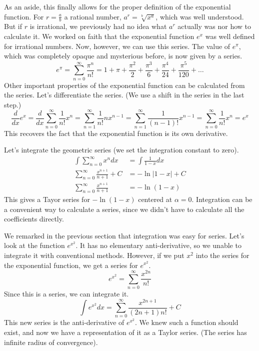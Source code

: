 \documentclass[fleqn,letterpaper]{report}
\begin{document}
As an aside, this finally allows for the proper definition of
the exponential function. For $r = \frac{a}{b}$ a rational
number, $a^r = \sqrt[b]{x^a}$, which was well understood. But
if $r$ is irrational, we previously had no idea what $a^r$
actually was nor how to calculate it. We worked on faith that
the exponential function $e^x$ was well defined for irrational
numbers. Now, however, we can use this series. The value of
$e^{\pi}$, which was completely opaque and mysterious before,
is now given by a series.
\begin{equation*}
e^{\pi} = \sum_{n=0}^\infty \frac{\pi^n}{n!} = 1 + \pi +
\frac{\pi^2}{2} + \frac{\pi^3}{6} + \frac{\pi^4}{24} +
\frac{\pi^5}{120} + \ldots
\end{equation*}
Other important properties of the exponential function can be
calculated from the series. Let's differentiate the series. (We
use a shift in the series in the last step.)
\begin{equation*}
\frac{d}{dx} e^x = \frac{d}{dx} \sum_{n=0}^\infty \frac{1}{n!}
x^n = \sum_{n=1}^\infty \frac{1}{n!} n x^{n-1} =
\sum_{n=1}^\infty \frac{1}{(n-1)!} x^{n-1} = \sum_{n=0}^\infty
\frac{1}{n!} x^n = e^x
\end{equation*}
This recovers the fact that the exponential function is its own
derivative.

\begin{example}
Let's integrate the geometric series (we set the integration
constant to zero).
\begin{align*}
\int \sum_{n=0}^\infty x^n dx & = \int \frac{1}{1-x} dx \\
\sum_{n=0}^\infty \frac{x^{n+1}}{n+1} + C & = -\ln |1-x| + C \\
\sum_{n=0}^\infty \frac{x^{n+1}}{n+1} 
& = -\ln (1-x) 
\end{align*}
This gives a Tayor series for $- \ln (1-x)$ centered at
$\alpha = 0$. Integration can be a convenient way to calculate a
series, since we didn't have to calculate all the coefficients
directly.
\end{example}

\begin{example}
We remarked in the previous section that integration was easy
for series. Let's look at the function $e^{x^2}$. It has no
elementary anti-derivative, so we unable to integrate it with
conventional methods. However, if we put $x^2$ into the series
for the exponential function, we get a series for $e^{x^2}$.
\begin{equation*}
e^{x^2} = \sum_{n=0}^\infty \frac{x^{2n}}{n!}
\end{equation*}
Since this is a series, we can integrate it.
\begin{equation*}
\int e^{x^2} dx = \sum_{n=0}^\infty \frac{x^{2n+1}}{(2n+1)n!} +
C
\end{equation*}
This new series is the anti-derivative of $e^{x^2}$. We knew
such a function should exist, and now we have a
representation of it as a Taylor series. (The series has
infinite radius of convergence). 
\end{example}
\end{document}
